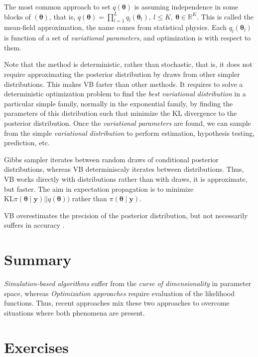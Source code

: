 The most common approach to set $q(\boldsymbol{\theta})$ is assuming independence in some blocks of $(\boldsymbol{\theta})$, that is, $q(\boldsymbol{\theta})=\prod_{l=1}^L q_l(\boldsymbol{\theta}_l), \ l\leq K, \ \boldsymbol{\theta}\in\mathbb{R}^K$. This is called the mean-field approximation, the name comes from statistical physics. Each $q_l(\boldsymbol{\theta}_l)$ is function of a set of \textit{variational parameters}, and optimization is with respect to them.  

Note that the method is deterministic, rather than stochastic, that is, it does not require approximating the posterior distribution by draws from other simpler distributions. This makes VB faster than other methods. It requires to solve a deterministic optimization problem to find the \textit{best variational distribution} in a particular simple family, normally in the exponential family, by finding the parameters of this distribution such that minimize the KL divergence to the posterior distribution. Once the \textit{variational parameters} are found, we can sample from the simple \textit{variational distribution} to perform estimation, hypothesis testing, prediction, etc.  

Gibbs sampler iterates between random draws of conditional posterior distributions, whereas VB determiniscaly iterates between distributions. Thus, VB works directly with distributions rather than with draws, it is approximate, but faster. The aim in expectation propagation is to minimize $\text{KL}\pi(\boldsymbol{\theta} \mid \mathbf{y})||q(\boldsymbol{\theta}))$ rather than $\pi(\boldsymbol{\theta} \mid \mathbf{y})$.  

VB overestimates the precision of the posterior distribution, but not necessarily suffers in accuracy \cite{blei2017variational}.

\section{Summary}\label{sec15_3}
\textit{Simulation-based algorithms} suffer from the \textit{curse of dimensionality} in parameter space, whereas \textit{Optimization approaches} require evaluation of the likelihood functions. Thus, recent approaches mix these two approaches to overcome situations where both phenomena are present.

\section{Exercises}\label{sec15_4}

